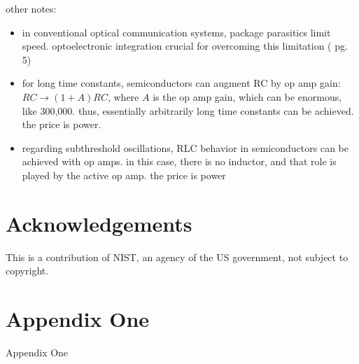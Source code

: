 \documentclass[twocolumn]{article}
\begin{document}
other notes:
\begin{itemize}
\item in conventional optical communication systems, package parasitics limit speed. optoelectronic integration crucial for overcoming this limitation (\cite{ra2012} pg. 5)
\item for long time constants, semiconductors can augment RC by op amp gain: $RC \rightarrow (1+A)RC$, where $A$ is the op amp gain, which can be enormous, like 300,000. thus, essentially arbitrarily long time constants can be achieved. the price is power.
\item regarding subthreshold oscillations, RLC behavior in semiconductors can be achieved with op amps. in this case, there is no inductor, and that role is played by the active op amp. the price is power
\end{itemize}

\section{Acknowledgements}

\vspace{1em}
\noindent This is a contribution of NIST, an agency of the US government, not subject to copyright.

\appendix

\section{\label{apx:one}Appendix One}
Appendix One

	

\end{document}
